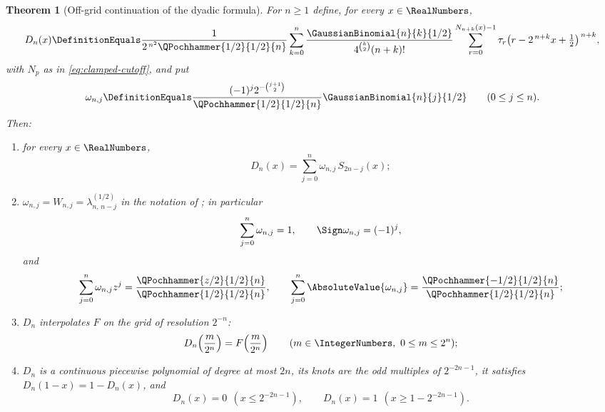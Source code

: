 \documentclass[11pt,a4paper,oneside,openany]{book}
\newtheorem{theorem}{Theorem}[chapter]
\theoremstyle{definition}
\theoremstyle{remark}
\begin{document}
\begin{theorem}[Off-grid continuation of the dyadic formula]\label{thm:offgrid-dyadic}
For $n\ge1$ define, for every $x\in\RealNumbers$,
\begin{equation}\label{eq:offgrid-dyadic-def}
 D_n(x)\DefinitionEquals\frac1{2^{\,n^2}\QPochhammer{1/2}{1/2}{n}}
 \sum_{k=0}^{n}\frac{\GaussianBinomial{n}{k}{1/2}}{4^{\binom k2}(n+k)!}
 \sum_{r=0}^{N_{n+k}(x)-1}
 \tau_r\bigl(r-2^{\,n+k}x+\tfrac12\bigr)^{\,n+k},
\end{equation}
with $N_p$ as in \eqref{eq:clamped-cutoff}, and put
\begin{equation}\label{eq:offgrid-weights}
 \omega_{n,j}\DefinitionEquals\frac{(-1)^j2^{-\binom{j+1}{2}}}{\QPochhammer{1/2}{1/2}{n}}
 \GaussianBinomial{n}{j}{1/2}
 \qquad(0\le j\le n).
\end{equation}
Then:
\begin{enumerate}
\item for every $x\in\RealNumbers$,
\begin{equation}\label{eq:offgrid-decomposition}
 D_n(x)=\sum_{j=0}^{n}\omega_{n,j}\,S_{2n-j}(x);
\end{equation}
\item $\omega_{n,j}=W_{n,j}=\lambda^{(1/2)}_{n,\,n-j}$ in the notation of
; in particular
\[
 \sum_{j=0}^{n}\omega_{n,j}=1,
 \qquad \Sign\omega_{n,j}=(-1)^j,
\]
and
\[
 \sum_{j=0}^{n}\omega_{n,j}z^j
 =\frac{\QPochhammer{z/2}{1/2}{n}}{\QPochhammer{1/2}{1/2}{n}},
 \qquad
 \sum_{j=0}^{n}\AbsoluteValue{\omega_{n,j}}
 =\frac{\QPochhammer{-1/2}{1/2}{n}}{\QPochhammer{1/2}{1/2}{n}};
\]
\item $D_n$ interpolates $F$ on the grid of resolution $2^{-n}$:
\begin{equation}\label{eq:offgrid-interpolation}
 D_n\!\left(\frac m{2^n}\right)=F\!\left(\frac m{2^n}\right)
 \qquad(m\in\IntegerNumbers,\ 0\le m\le2^n);
\end{equation}
\item $D_n$ is a continuous piecewise polynomial of degree at most $2n$, its
knots are the odd multiples of $2^{-2n-1}$, it satisfies
$D_n(1-x)=1-D_n(x)$, and
\begin{equation}\label{eq:offgrid-endpoints}
 D_n(x)=0\ \ (x\le2^{-2n-1}),
 \qquad
 D_n(x)=1\ \ (x\ge1-2^{-2n-1}).
\end{equation}
\end{enumerate}
\end{theorem}
\end{document}
